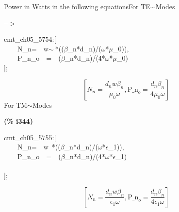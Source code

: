 \documentclass[fleqn]{article}
\begin{document}
\noindent%

Power in Watts in the following equationsFor TE\ensuremath{\sim }Modes


\noindent
\begin{minipage}[t]{4.000000em}\color{red}\bfseries
 --\ensuremath{\ensuremath{>}}	
\end{minipage}
\begin{minipage}[t]{\textwidth}\color{blue}
cmt\_ch05\_5754:[\\
\ \ \ \ N\_n=\ \ w\ensuremath{\sim\ }*((\ensuremath{\beta}\_n*d\_n)/(\ensuremath{\omega}*\ensuremath{\mu}\_0)),\\
\ \ \ \ P\_n\_o\ \ =\ \ (\ensuremath{\beta}\_n*d\_n)/(4*\ensuremath{\omega}*\ensuremath{\mu}\_0)\\
];
\end{minipage}
\[\displaystyle \tag{\% o343} 
\left[ {N_n}=\frac{{d_n} w {{\beta }_n}}{{{\mu }_0} \omega }\operatorname{,}{{\ensuremath{\mathrm{P\_ n}}}_o}=\frac{{d_n} {{\beta }_n}}{4 {{\mu }_0} \omega }\right] \mbox{}
\]
For TM\ensuremath{\sim }Modes


\noindent
\begin{minipage}[t]{4.000000em}\color{red}\bfseries
(\% i344)	
\end{minipage}
\begin{minipage}[t]{\textwidth}\color{blue}
cmt\_ch05\_5755:[\\
\ \ \ \ N\_n=\ \ w\ *((\ensuremath{\beta}\_n*d\_n)/(\ensuremath{\omega}*\ensuremath{\epsilon}\_1)),\\
\ \ \ \ P\_n\_o\ \ =\ \ (\ensuremath{\beta}\_n*d\_n)/(4*\ensuremath{\omega}*\ensuremath{\epsilon}\_1)\\
\\
];
\end{minipage}
\[\displaystyle \tag{\% o344} 
\left[ {N_n}=\frac{{d_n} w {{\beta }_n}}{{{\epsilon }_1} \omega }\operatorname{,}{{\ensuremath{\mathrm{P\_ n}}}_o}=\frac{{d_n} {{\beta }_n}}{4 {{\epsilon }_1} \omega }\right] \mbox{}
\]
\end{document}
